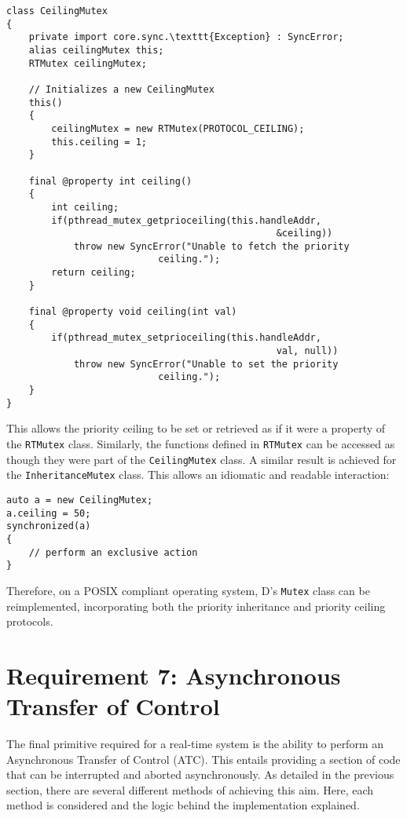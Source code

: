 \begin{lstlisting}[basicstyle=\small]
class CeilingMutex 
{
    private import core.sync.\texttt{Exception} : SyncError;
    alias ceilingMutex this;
    RTMutex ceilingMutex;

    // Initializes a new CeilingMutex
    this()
    {
        ceilingMutex = new RTMutex(PROTOCOL_CEILING);
        this.ceiling = 1;
    }

    final @property int ceiling()
    {
        int ceiling; 
        if(pthread_mutex_getprioceiling(this.handleAddr, 
                                                &ceiling))
            throw new SyncError("Unable to fetch the priority 
                           ceiling."); 
        return ceiling; 
    }

    final @property void ceiling(int val)
    {
        if(pthread_mutex_setprioceiling(this.handleAddr, 
                                                val, null))
            throw new SyncError("Unable to set the priority 
                           ceiling."); 
    }
}
\end{lstlisting}
This allows the priority ceiling to be set or retrieved as if it were a property of 
the \texttt{RTMutex} class. Similarly, the functions defined in \texttt{RTMutex} 
can be accessed as though they were part of the \texttt{CeilingMutex} class. 
A similar result is achieved for the \texttt{InheritanceMutex} class.
This allows an idiomatic and readable interaction: 
\begin{lstlisting}[basicstyle=\small]
auto a = new CeilingMutex;
a.ceiling = 50; 
synchronized(a) 
{
    // perform an exclusive action
}
\end{lstlisting}
Therefore, on a POSIX compliant operating system, D's \texttt{Mutex} class can 
be reimplemented, incorporating both the priority inheritance and 
priority ceiling protocols. 

\section{Requirement 7: Asynchronous Transfer of Control} %
The final primitive required for a real-time system is the ability to perform an Asynchronous Transfer of 
Control (ATC). This entails providing a section of code that can be interrupted 
and aborted asynchronously.
As detailed in the previous section, there are several different methods of 
achieving this aim. Here, each method is considered and the logic behind the 
implementation explained. 

